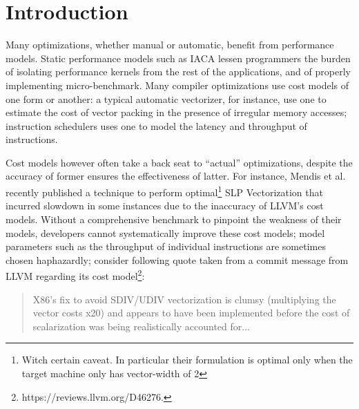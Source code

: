 \section{Introduction}
Many optimizations, whether manual or automatic,
benefit from performance models.
Static performance models such as IACA lessen programmers
the burden of isolating performance kernels from
the rest of the applications,
and of properly implementing micro-benchmark. Many compiler optimizations
use cost models of one form or another:
a typical automatic vectorizer, for instance,
use one to estimate the cost of vector packing
in the presence of irregular memory accesses;
instruction schedulers uses one to model the latency
and throughput of instructions.

Cost models however often take a back seat to “actual” optimizations,
despite the accuracy of former ensures the effectiveness of latter.
For instance, Mendis et al.\cite{goslp}
recently published a technique to perform optimal\footnote{
Witch certain caveat.
In particular their formulation is optimal
only when the target machine only has vector-width of 2}
SLP Vectorization\cite{slp} that
incurred slowdown in some instances due to the inaccuracy of 
LLVM's cost models.
Without a comprehensive benchmark to pinpoint the weakness of their models,
developers cannot systematically improve these cost models;
model parameters
such as the throughput of individual instructions
are sometimes chosen haphazardly;
consider following quote taken from a commit message from LLVM\cite{llvm}
regarding its cost model\footnote{
https://reviews.llvm.org/D46276.
}:
\begin{quote}
X86's fix to avoid SDIV/UDIV vectorization is clumsy
(multiplying the vector costs x20)
and appears to have been implemented before the cost of
scalarization was being realistically accounted for...
\end{quote}

